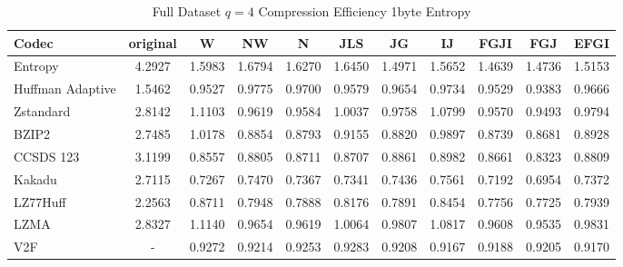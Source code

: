 \documentclass{article}
\begin{document}
\begin{table}[h!]
\centering
\caption{Full Dataset $q=4$ Compression Efficiency 1byte Entropy}
\begin{tabular}{|l|cccccccccc|}
\hline
Codec &  original &      W &     NW &      N &    JLS &     JG &     IJ &   FGJI &    FGJ &   EFGI \\
\hline
Entropy & 4.2927 & 1.5983 & 1.6794 & 1.6270 & 1.6450 & 1.4971 & 1.5652 & 1.4639 & 1.4736 & 1.5153 \\
\hline
Huffman Adaptive &    1.5462 & 0.9527 & 0.9775 & 0.9700 & 0.9579 & 0.9654 & 0.9734 & 0.9529 & 0.9383 & 0.9666 \\
Zstandard        &    2.8142 & 1.1103 & 0.9619 & 0.9584 & 1.0037 & 0.9758 & 1.0799 & 0.9570 & 0.9493 & 0.9794 \\
BZIP2            &    2.7485 & 1.0178 & 0.8854 & 0.8793 & 0.9155 & 0.8820 & 0.9897 & 0.8739 & 0.8681 & 0.8928 \\
CCSDS 123        &    3.1199 & 0.8557 & 0.8805 & 0.8711 & 0.8707 & 0.8861 & 0.8982 & 0.8661 & 0.8323 & 0.8809 \\
Kakadu           &    2.7115 & 0.7267 & 0.7470 & 0.7367 & 0.7341 & 0.7436 & 0.7561 & 0.7192 & 0.6954 & 0.7372 \\
LZ77Huff         &    2.2563 & 0.8711 & 0.7948 & 0.7888 & 0.8176 & 0.7891 & 0.8454 & 0.7756 & 0.7725 & 0.7939 \\
LZMA             &    2.8327 & 1.1140 & 0.9654 & 0.9619 & 1.0064 & 0.9807 & 1.0817 & 0.9608 & 0.9535 & 0.9831 \\
V2F              &    - & 0.9272 & 0.9214 & 0.9253 & 0.9283 & 0.9208 & 0.9167 & 0.9188 & 0.9205 & 0.9170 \\
\hline
\end{tabular}
\end{table}
\end{document}
